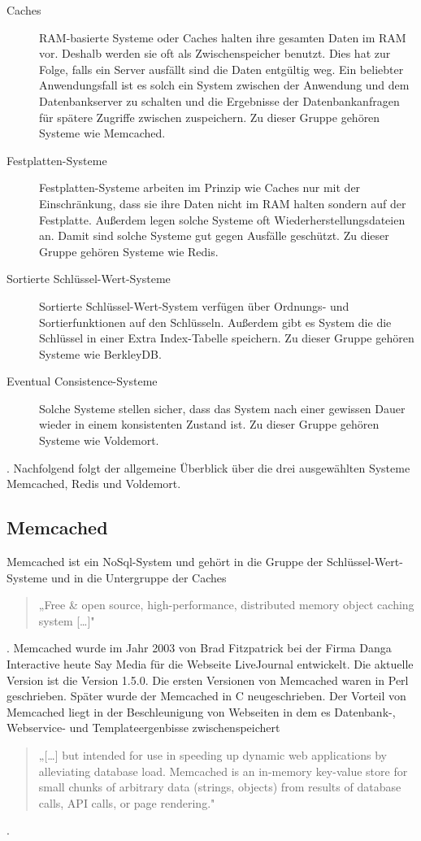 \begin{description}
    \item[Caches] \gls{RAM}-basierte Systeme oder Caches halten ihre gesamten
        Daten im \gls{RAM} vor. Deshalb werden sie oft als Zwischenspeicher
        benutzt. Dies hat zur Folge, falls ein Server ausfällt sind die Daten
        entgültig weg. Ein beliebter Anwendungsfall ist es solch ein System
        zwischen der Anwendung und dem Datenbankserver zu schalten und die
        Ergebnisse der Datenbankanfragen für spätere Zugriffe zwischen
        zuspeichern. Zu dieser Gruppe gehören Systeme wie Memcached.
    \item[Festplatten-Systeme] Festplatten-Systeme arbeiten im Prinzip wie Caches
        nur mit der Einschränkung, dass sie ihre Daten nicht im \gls{RAM} halten
        sondern auf der Festplatte. Außerdem legen solche Systeme oft
        Wiederherstellungsdateien an. Damit sind solche Systeme gut gegen
        Ausfälle geschützt. Zu dieser Gruppe gehören Systeme wie Redis.
    \item[Sortierte Schlüssel-Wert-Systeme] Sortierte Schlüssel-Wert-System
        verfügen über Ordnungs- und Sortierfunktionen auf den Schlüsseln.
        Außerdem gibt es System die die Schlüssel in einer Extra Index-Tabelle
        speichern. Zu dieser Gruppe gehören Systeme wie BerkleyDB.
    \item[Eventual Consistence-Systeme] Solche Systeme stellen sicher, dass das
        System nach einer gewissen Dauer wieder in einem konsistenten Zustand
        ist. Zu dieser Gruppe gehören Systeme wie Voldemort.
\end{description}

. Nachfolgend folgt der allgemeine Überblick über die drei ausgewählten Systeme
Memcached, Redis und Voldemort.

\subsection{Memcached}
Memcached ist ein NoSql-System und gehört in die Gruppe der
Schlüssel-Wert-Systeme und in die Untergruppe der Caches 
\begin{quote}
   „Free \& open source, high-performance, distributed memory object caching
    system [\dots]" \cite{Memcached2015}
\end{quote}
. Memcached wurde im Jahr 2003 von Brad Fitzpatrick bei der Firma Danga
Interactive heute Say Media für die Webseite LiveJournal entwickelt. Die
aktuelle Version ist die Version 1.5.0. Die ersten Versionen von Memcached
waren in Perl geschrieben. Später wurde der Memcached in C neugeschrieben. Der
Vorteil von Memcached liegt in der Beschleunigung von Webseiten in dem es
Datenbank-, Webservice- und Templateergenbisse zwischenspeichert 
\begin{quote}
    „[\dots{}] but intended for use in speeding up dynamic web
applications by alleviating database load. Memcached is an in-memory key-value
store for small chunks of arbitrary data (strings, objects) from results of
database calls, API calls, or page rendering." \cite{Memcached2015}
\end{quote}
.

